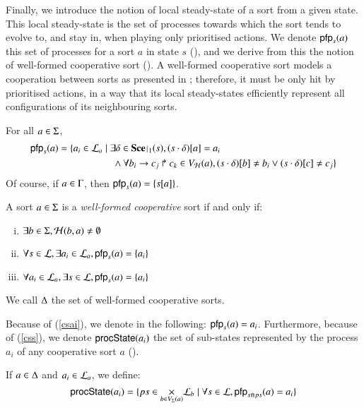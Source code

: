 Finally, we introduce the notion of local steady-state of a sort from a given state.
This local steady-state is the set of processes towards which the sort tends to evolve to, and stay in, when playing only prioritised actions.
We denote $\mathsf{pfp}_s(a)$ this set of processes for a sort $a$ in state $s$ (),
and we derive from this the notion of well-formed cooperative sort ().
A well-formed cooperative sort models a cooperation between sorts as presented in ;
therefore, it must be only hit by prioritised actions,
in a way that its local steady-states efficiently represent all configurations of its neighbouring sorts.
\begin{definition}[$\pfp : \PHs \rightarrow \powerset(\PHproc)$]
\label{def:pfp}
  For all $a \in \Sigma$,
  \begin{align*}
    \pfp_s(a) = \{ a_i \in \PHl_a &\mid \exists \delta \in \restriction{\Sce}{1}(s), \PHget{(s \PHplay \delta)}{a} = a_i \\
    & \quad \wedge \forall \PHhit{b_i}{c_j}{c_k} \in \Vh(a), \PHget{(s \PHplay \delta)}{b} \neq b_i \vee \PHget{(s \PHplay \delta)}{c} \neq c_j \}
  \end{align*}
  Of course, if $a \in \Gamma$, then $\mathsf{pfp}_s(a) = \{ {s[a]} \}$.
\end{definition}
%
\begin{definition}
\label{def:cs}
  A sort $a \in \Sigma$ is a \emph{well-formed cooperative} sort if and only if:
  \begin{enumerate}[(i)]
    \item $\exists b \in \Sigma, \mathcal{H}(b, a) \neq \emptyset$
    \item \label{csai} $\forall s \in \mathcal{L}, \exists a_i \in \mathcal{L}_a, \mathsf{pfp}_s(a) = \{ a_i \}$
    \item \label{css} $\forall a_i \in \mathcal{L}_a, \exists s \in \mathcal{L}, \mathsf{pfp}_s(a) = \{ a_i \}$
  \end{enumerate}
  We call $\Delta$ the set of well-formed cooperative sorts.
\end{definition}

Because of (\ref{csai}), we denote in the following: $\mathsf{pfp}_s(a) = a_i$.
Furthermore, because of (\ref{css}), we denote $\mathsf{procState}(a_i)$ the set of sub-states represented by the process $a_i$ of any cooperative sort $a$ ().
\begin{definition}[$\csState : \PHproc \rightarrow \powerset(\PHproc)$]
\label{def:csState}
  If $a \in \Delta$ and $a_i \in \mathcal{L}_a$, we define:
  $$\mathsf{procState}(a_i) = \{ ps \in \underset{b \in V_\Sigma(a)}{\times} \mathcal{L}_b \mid \forall s \in \mathcal{L}, \mathsf{pfp}_{s \Cap ps}(a) = a_i \}$$
\end{definition}

